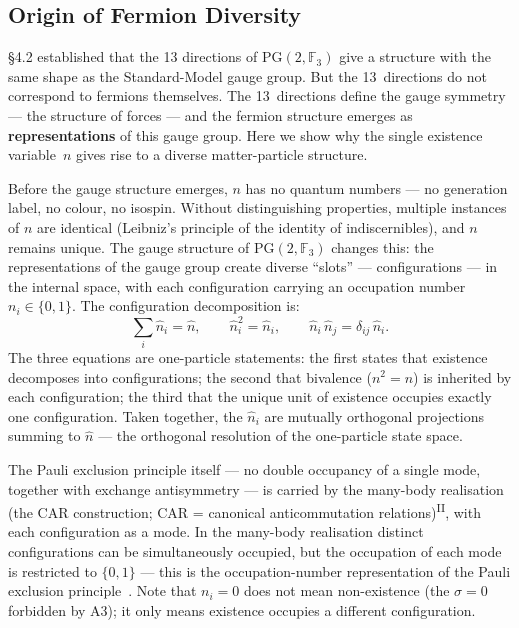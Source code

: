 \documentclass[12pt,a4paper]{article}
\newcommand{\PII}{\textsuperscript{\textup{II}}}
\begin{document}
\medskip

\subsection{Origin of Fermion Diversity}

\S4.2 established that the 13 directions of $\mathrm{PG}(2,\mathbb{F}_3)$
give a structure with the same shape as the Standard-Model gauge group.
But the 13~directions do not correspond to fermions themselves.
The 13~directions define the gauge symmetry --- the structure of forces ---
and the fermion structure emerges as \textbf{representations} of this
gauge group.
Here we show why the single existence variable~$n$ gives rise to a
diverse matter-particle structure.

Before the gauge structure emerges, $n$ has no quantum numbers ---
no generation label, no colour, no isospin. Without distinguishing
properties, multiple instances of $n$ are identical
(Leibniz's principle of the identity of indiscernibles),
and $n$ remains unique.
The gauge structure of $\mathrm{PG}(2,\mathbb{F}_3)$ changes this:
the representations of the gauge group create diverse ``slots'' --- configurations ---
in the internal space, with each configuration carrying an occupation number $n_i \in \{0,1\}$. The configuration decomposition is:
\begin{equation}
  \sum_i \hat{n}_i = \hat{n}, \qquad
  \hat{n}_i^2 = \hat{n}_i, \qquad
  \hat{n}_i\,\hat{n}_j = \delta_{ij}\,\hat{n}_i.
\end{equation}
The three equations are one-particle statements: the first states that existence decomposes into configurations; the second that bivalence ($n^2{=}n$) is inherited by each configuration; the third that the unique unit of existence occupies exactly one configuration. Taken together, the $\hat n_i$ are mutually orthogonal
projections summing to $\hat n$ --- the orthogonal resolution of the one-particle state space.

The Pauli exclusion principle itself --- no double occupancy of
a single mode, together with exchange antisymmetry --- is carried by
the many-body realisation (the CAR construction; CAR = canonical anticommutation relations)\PII{}, with each configuration as a mode. In the many-body realisation
distinct configurations can be simultaneously occupied, but the
occupation of each mode is restricted to $\{0,1\}$ --- this is the
occupation-number representation of the Pauli exclusion
principle~\cite{pauli}. Note that $n_i = 0$ does not mean non-existence (the $\sigma = 0$ forbidden by A3); it only means existence occupies a different configuration.
\end{document}
